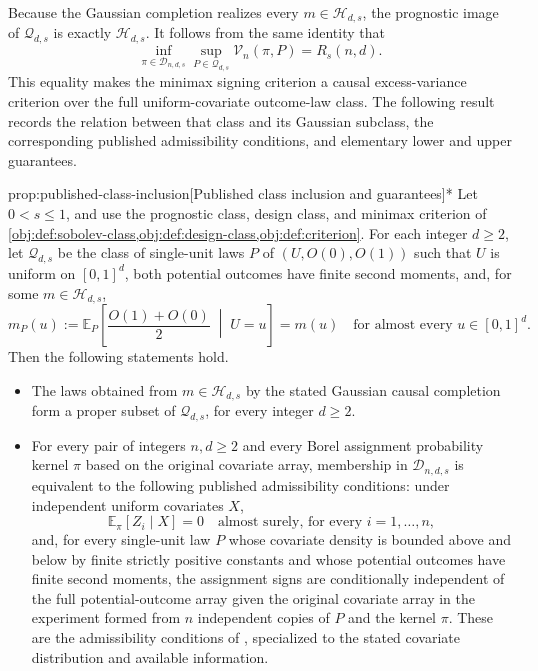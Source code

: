 Because the Gaussian completion realizes every \(m\in\mathcal H_{d,s}\), the prognostic image of \(\mathcal Q_{d,s}\) is exactly \(\mathcal H_{d,s}\). It follows from the same identity that
\[
\inf_{\pi\in\mathcal D_{n,d,s}}
\sup_{P\in\mathcal Q_{d,s}}
\mathcal V_n(\pi,P)
=
R_s(n,d).
\]
This equality makes the minimax signing criterion a causal excess-variance criterion over the full uniform-covariate outcome-law class. The following result records the relation between that class and its Gaussian subclass, the corresponding published admissibility conditions, and elementary lower and upper guarantees.

\begin{propositionv}{prop:published-class-inclusion}[Published class inclusion and guarantees]*
Let \(0<s\leq1\), and use the prognostic class, design class, and minimax criterion of \cref{obj:def:sobolev-class,obj:def:design-class,obj:def:criterion}. For each integer \(d\geq2\), let \(\mathcal Q_{d,s}\) be the class of single-unit laws \(P\) of \((U,O(0),O(1))\) such that \(U\) is uniform on \([0,1]^d\), both potential outcomes have finite second moments, and, for some \(m\in\mathcal H_{d,s}\),
\[
m_P(u):=\mathbb E_P\!\left[\frac{O(1)+O(0)}2\;\middle|\;U=u\right]
=m(u)
\quad\text{for almost every }u\in[0,1]^d.
\]
Then the following statements hold.
\begin{itemize}
\item The laws obtained from \(m\in\mathcal H_{d,s}\) by the stated Gaussian causal completion form a proper subset of \(\mathcal Q_{d,s}\), for every integer \(d\geq2\).

\item For every pair of integers \(n,d\geq2\) and every Borel assignment probability kernel \(\pi\) based on the original covariate array, membership in \(\mathcal D_{n,d,s}\) is equivalent to the following published admissibility conditions: under independent uniform covariates \(X\),
\[
\mathbb E_\pi[Z_i\mid X]=0
\quad\text{almost surely, for every }i=1,\ldots,n,
\]
and, for every single-unit law \(P\) whose covariate density is bounded above and below by finite strictly positive constants and whose potential outcomes have finite second moments, the assignment signs are conditionally independent of the full potential-outcome array given the original covariate array in the experiment formed from \(n\) independent copies of \(P\) and the kernel \(\pi\). These are the admissibility conditions of \citet[Assumption 2.1 and Definition 2.2]{Cytrynbaum2026Limits}, specialized to the stated covariate distribution and available information.


\end{itemize}
\end{propositionv}
